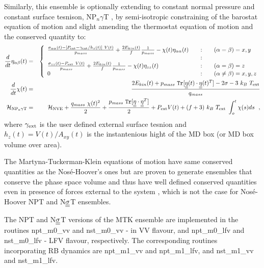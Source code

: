Similarly, this ensemble is optionally extending to constant
normal pressure and constant surface tesnison, NP$_{n}\gamma$T
\cite{ikeguchi-04}, by semi-isotropic constraining of the
barostat equation of motion  and slight amending the thermostat
equation of motion and the conserved quantity to:
\begin{eqnarray}
\frac{d}{dt} \eta_{\alpha\beta}(t) &=& \left\{ \begin{array} {l@{\qquad:\qquad}l}
\frac{\sigma_{\alpha\alpha}(t) - \left[ P_{\rm ext} - \gamma_{\rm ext} / h_{z}(t) \right]~V(t)}{p_{mass}} +
\frac{2 E_{kin}(t)}{f} \frac{1}{p_{mass}} - \chi(t) \eta_{\alpha\alpha}(t) & (\alpha = \beta) = x,y \\
& \\
\frac{\sigma_{zz}(t) - P_{\rm ext}~V(t)}{p_{mass}} +
\frac{2 E_{kin}(t)}{f} \frac{1}{p_{mass}} - \chi(t) \eta_{zz}(t) & (\alpha = \beta) = z \\
0 & (\alpha \ne \beta) = x,y,z
\end{array} \right. \nonumber \\
\frac{d}{dt} \chi(t) &=& \frac{2 E_{kin}(t) + p_{mass}~{\tt Tr}[\mat{\eta}(t) \cdot
\mat{\eta}(t)^{T}] - 2 \sigma - 3~k_{B}~T_{\rm ext}}{q_{mass}} \\
{\cal H}_{\rm NP_{n}\gamma T} &=& {\cal H}_{\rm NVE} + {q_{mass}~\chi (t)^{2} \over 2} +
{p_{mass}~{\tt Tr}[\mat{\eta} \cdot \mat{\eta}^{T}] \over 2} + P_{\rm ext} V(t) +
(f+3)~k_{B}~T_{\rm ext}~\int_o^t \chi (s) ds~~, \nonumber
\end{eqnarray}
where $\gamma_{\rm ext}$ is the user defined external surface tesnion
and $h_{z}(t) = V(t) / A_{xy}(t)$ is the instantenious hight of the
MD box (or MD box volume over area).

The Martyna-Tuckerman-Klein equations of motion have same
conserved quantities as the Nos\'e-Hoover's ones but are proven
to generate ensembles that conserve the phase space volume and
thus have well defined conserved quantities even in presence of
forces external to the system \cite{martyna-94a}, which is not
the case for Nos\'{e}-Hoover NPT and N$\mbox{$\underline{\underline{\bf \sigma}}$}$T ensembles.

The NPT and N$\mbox{$\underline{\underline{\bf \sigma}}$}$T versions of the MTK ensemble are
implemented in the \D routines {\sc npt\_m0\_vv} and
{\sc nst\_m0\_vv} - in VV flavour, and {\sc npt\_m0\_lfv}
and {\sc nst\_m0\_lfv} - LFV flavour, respectively.
The corresponding routines incorporating RB dynamics are
{\sc npt\_m1\_vv} and {\sc npt\_m1\_lfv}, and {\sc nst\_m1\_vv} and {\sc nst\_m1\_lfv}.

